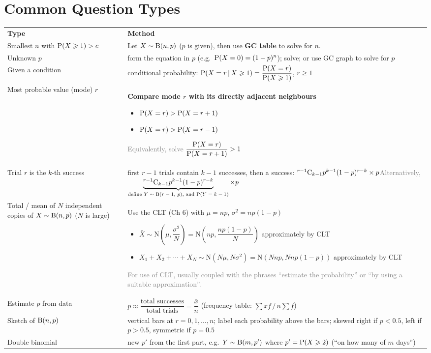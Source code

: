 \section{Common Question Types}
\begin{center}\renewcommand{\arraystretch}{1.12}\footnotesize
\begin{tabular}{|L{4.6cm}|L{10.6cm}|}\hline
\textbf{Type} & \textbf{Method}\\\Xhline{2pt}
Smallest $n$ with $\mathrm{P}(X\geqslant1)>c$ & Let $X\sim\mathrm{B}(n,p)$ ($p$ is given), then use \textbf{GC table} to solve for $n$.\\\hline
Unknown $p$ & form the equation in $p$ (e.g.\ $\mathrm{P}(X=0)=(1-p)^{n}$); solve; or use GC graph to solve for $p$\\\hline
Given a condition & conditional probability: $\mathrm{P}(X=r\,|\, X\geqslant1)=\dfrac{\mathrm{P}(X=r)}{\mathrm{P}(X\geqslant1)}$, $r\geqslant1$\\\hline
Most probable value (mode) $r$ & \textbf{Compare mode $r$ with its directly adjacent neighbours}\begin{itemize}[leftmargin=*,nosep]\item $\mathrm{P}(X=r)>\mathrm{P}(X=r+1)$\item $\mathrm{P}(X=r)>\mathrm{P}(X=r-1)$\end{itemize}\textcolor{gray}{Equivalently, solve $\dfrac{\mathrm{P}(X=r)}{\mathrm{P}(X=r+1)}>1$}\\\hline
Trial $r$ is the $k$-th success & first $r-1$ trials contain $k-1$ successes, then a success: ${}^{r-1}\mathrm{C}_{k-1}p^{k-1}(1-p)^{r-k}\times p$\newline \textcolor{gray}{Alternatively,} $\underbrace{{}^{r-1}\mathrm{C}_{k-1}p^{k-1}(1-p)^{r-k}}_{\mbox{\scriptsize define $Y\sim\mathrm{B}(r-1,\,p)$, and $\mathrm{P}(Y=k-1)$}}\times p$\\\hline
Total / mean of $N$ independent copies of $X\sim\mathrm{B}(n,p)$ ($N$ is large) & Use the CLT (Ch 6) with $\mu=np$, $\sigma^{2}=np(1-p)$\begin{itemize}[leftmargin=*,nosep]\item $\bar{X}\sim\mathrm{N}\!\left(\mu,\dfrac{\sigma^{2}}{N}\right)=\mathrm{N}\!\left(np,\dfrac{np(1-p)}{N}\right)$ approximately by CLT\item $X_{1}+X_{2}+\cdots+X_{N}\sim\mathrm{N}(N\mu,N\sigma^{2})=\mathrm{N}(Nnp,Nnp(1-p))$ approximately by CLT\end{itemize}\textcolor{gray}{For use of CLT, usually coupled with the phrases ``estimate the probability'' or ``by using a suitable approximation''.}\\\hline
Estimate $p$ from data & $p\approx\dfrac{\text{total successes}}{\text{total trials}}=\dfrac{\bar{x}}{n}$ (frequency table: $\sum xf\,/\,n\sum f$)\\\hline
Sketch of $\mathrm{B}(n,p)$ & vertical bars at $r=0,1,\dots,n$; label each probability above the bars; skewed right if $p<0.5$, left if $p>0.5$, symmetric if $p=0.5$\\\hline
Double binomial & new $p'$ from the first part, e.g.\ $Y\sim\mathrm{B}(m,p')$ where $p'=\mathrm{P}(X\geqslant2)$ (``on how many of $m$ days'')\\\hline
\end{tabular}\end{center}
